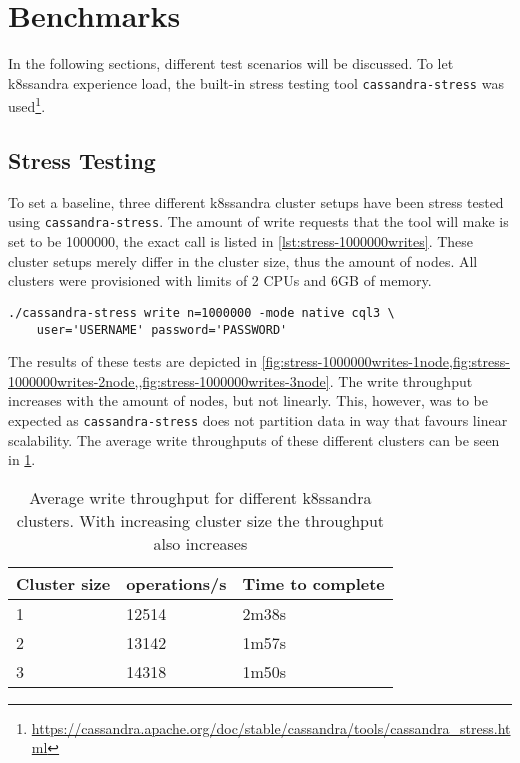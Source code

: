 \section{Benchmarks}

In the following sections, different test scenarios will be discussed. To let k8ssandra experience load, the built-in stress testing tool \texttt{cassandra-stress} was used\footnote{\raggedright\url{https://cassandra.apache.org/doc/stable/cassandra/tools/cassandra_stress.html}}.

\subsection{Stress Testing}

To set a baseline, three different k8ssandra cluster setups have been stress tested using \texttt{cassandra-stress}. The amount of write requests that the tool will make is set to be 1000000, the exact call is listed in \cref{lst:stress-1000000writes}. These cluster setups merely differ in the cluster size, thus the amount of nodes. All clusters were provisioned with limits of 2 CPUs and 6GB of memory.

\begin{lstlisting}[caption={},
                    captionpos=b,
                    label=lst:stress-1000000writes,
                    float]
./cassandra-stress write n=1000000 -mode native cql3 \
    user='USERNAME' password='PASSWORD'
\end{lstlisting}

The results of these tests are depicted in \cref{fig:stress-1000000writes-1node,fig:stress-1000000writes-2node,,fig:stress-1000000writes-3node}. The write throughput increases with the amount of nodes, but not linearly. This, however, was to be expected as \texttt{cassandra-stress} does not partition data in way that favours linear scalability. The average write throughputs of these different clusters can be seen in \cref{tab:stress-1000000writes-ops}.

\begin{table}[H]
\centering
\begin{tabular}{|l|l|l|}
\hline
\textbf{Cluster size} & \textbf{operations/s} & \textbf{Time to complete} \\ \hline
1                     & 12514                 & 2m38s                     \\ \hline
2                     & 13142                 & 1m57s                     \\ \hline
3                     & 14318                 & 1m50s                     \\ \hline
\end{tabular}
\caption{Average write throughput for different k8ssandra clusters. With increasing cluster size the throughput also increases}
\label{tab:stress-1000000writes-ops}
\end{table}

